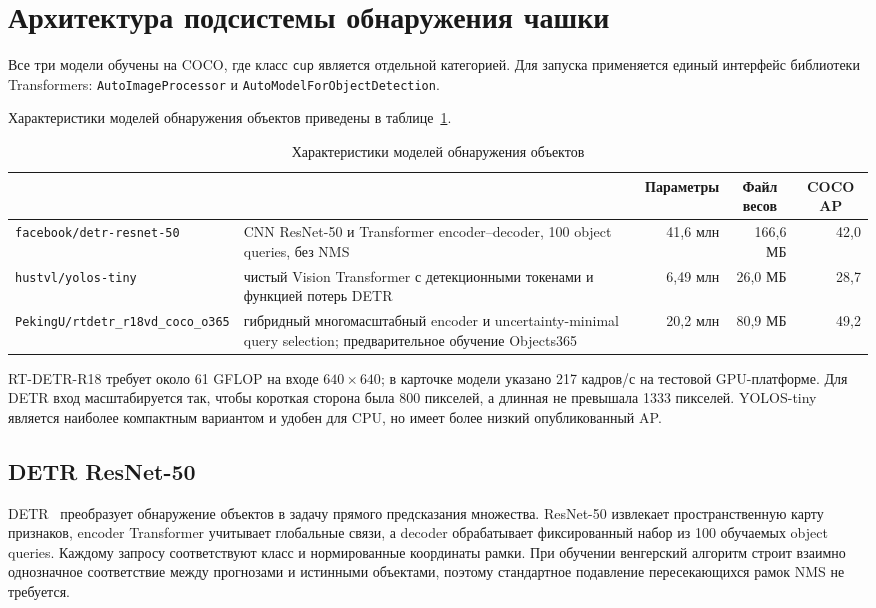 \documentclass[a4paper,12pt]{extreport}
\newcommand{\code}[1]{\nolinkurl{#1}}
\begin{document}
\section{Архитектура подсистемы обнаружения чашки}

Все три модели обучены на COCO, где класс \code{cup} является отдельной категорией. Для запуска применяется единый интерфейс библиотеки Transformers: \code{AutoImageProcessor} и \code{AutoModelForObjectDetection}.

Характеристики моделей обнаружения объектов приведены в таблице~\ref{tab:cup-models}.

\begin{table}[H]
\centering\small
\caption{Характеристики моделей обнаружения объектов}
\label{tab:cup-models}
\begin{tabularx}{\textwidth}{|>{\raggedright\arraybackslash}p{3.4cm}|>{\raggedright\arraybackslash}X|r|r|r|}
\hline
\multicolumn{1}{|c|}{Модель} & \multicolumn{1}{>{\centering\arraybackslash}X|}{Особенность} & \multicolumn{1}{c|}{Параметры} & \multicolumn{1}{c|}{Файл весов} & \multicolumn{1}{c|}{COCO AP} \\
\hline
\code{facebook/detr-resnet-50} & CNN ResNet-50 и Transformer encoder--decoder, 100 object queries, без NMS & 41,6 млн & 166,6 МБ & 42,0\\ \hline
\code{hustvl/yolos-tiny} & чистый Vision Transformer с детекционными токенами и функцией потерь DETR & 6,49 млн & 26,0 МБ & 28,7\\ \hline
\code{PekingU/rtdetr_r18vd_coco_o365} & гибридный многомасштабный encoder и uncertainty-minimal query selection; предварительное обучение Objects365 & 20,2 млн & 80,9 МБ & 49,2\\
\hline
\end{tabularx}
\end{table}

RT-DETR-R18 требует около 61 GFLOP на входе $640\times640$; в карточке модели указано 217 кадров/с на тестовой GPU-платформе. Для DETR вход масштабируется так, чтобы короткая сторона была 800 пикселей, а длинная не превышала 1333 пикселей. YOLOS-tiny является наиболее компактным вариантом и удобен для CPU, но имеет более низкий опубликованный AP.

\subsection{DETR ResNet-50}

DETR~\cite{carion} преобразует обнаружение объектов в задачу прямого предсказания множества. ResNet-50 извлекает пространственную карту признаков, encoder Transformer учитывает глобальные связи, а decoder обрабатывает фиксированный набор из 100 обучаемых object queries. Каждому запросу соответствуют класс и нормированные координаты рамки. При обучении венгерский алгоритм строит взаимно однозначное соответствие между прогнозами и истинными объектами, поэтому стандартное подавление пересекающихся рамок NMS не требуется.
\end{document}
